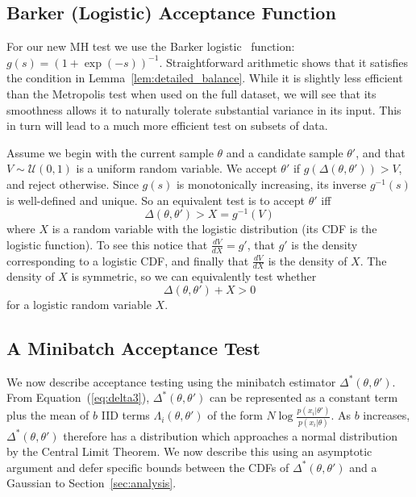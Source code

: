 \documentclass[twoside]{article} \usepackage{aistats2017}
\begin{document}
\subsection{Barker (Logistic) Acceptance Function}\label{ssec:barker_function}
For our new MH test we use the Barker logistic~\citep{Barker65} function:
$g(s)=(1+\exp(-s))^{-1}$. Straightforward arithmetic shows that it satisfies the
condition in Lemma~\ref{lem:detailed_balance}.  While it is slightly less
efficient than the Metropolis test when used on the full dataset, we will see
that its smoothness allows it to naturally tolerate substantial variance in its
input. This in turn will lead to a much more efficient test on subsets of data.

Assume we begin with the current sample $\theta$ and a candidate sample
$\theta'$, and that $V \sim \mathcal{U}(0,1)$ is a uniform random variable. We
accept $\theta'$ if $g(\Delta(\theta,\theta')) > V$, and reject otherwise.
Since $g(s)$ is monotonically increasing, its inverse $g^{-1}(s)$ is
well-defined and unique. So an equivalent test is to accept $\theta'$ iff
\begin{equation}\label{eq:equivalent_test}
    \Delta(\theta,\theta') > X = g^{-1}(V)
\end{equation}
where $X$ is a random variable with the logistic distribution (its CDF is the
logistic function). To see this notice that $\frac{dV}{dX} = g'$, that $g'$ is
the density corresponding to a logistic CDF, and finally that $\frac{dV}{dX}$ is
the density of $X$. The density of $X$ is symmetric, so we can equivalently test
whether
\begin{equation}\label{eq:the_exact_test}
    \Delta(\theta,\theta') + X > 0
\end{equation}
for a logistic random variable $X$.


\subsection{A Minibatch Acceptance Test}\label{ssec:deltas_minibatch}

We now describe acceptance testing using the minibatch estimator
$\Delta^*(\theta,\theta')$. From Equation~(\ref{eq:delta3}),
$\Delta^*(\theta,\theta')$ can be represented as a constant term plus the mean
of $b$ IID terms $\Lambda_i(\theta,\theta')$ of the form
$N\log\frac{p(x_i|\theta')}{p(x_i|\theta)}$. As $b$ increases,
$\Delta^*(\theta,\theta')$ therefore has a distribution which approaches a
normal distribution by the Central Limit Theorem. We now describe this using an
asymptotic argument and defer specific bounds between the CDFs of
$\Delta^*(\theta,\theta')$ and a Gaussian to Section~\ref{sec:analysis}.
\end{document}
